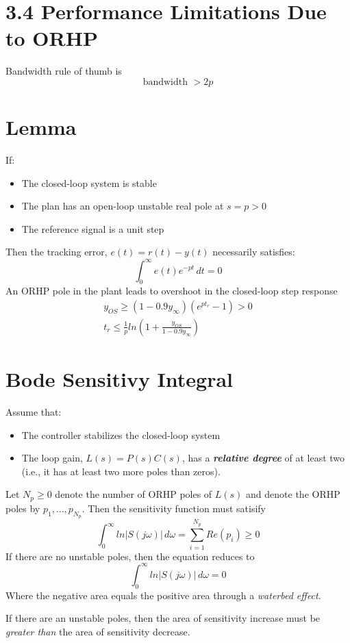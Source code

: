 \section*{3.4 Performance Limitations Due to ORHP}
Bandwidth rule of thumb is
\[ \text{bandwidth } > 2p \]

\section*{Lemma}
If:
\begin{itemize}
    \item The closed-loop system is stable
    \item The plan has an open-loop unstable real pole at \( s = p > 0 \)
    \item The reference signal is a unit step
\end{itemize}
Then the tracking error, \( e(t) = r(t) - y(t) \) necessarily satisfies:
\[
    \int_{0}^{\infty} e(t)e^{-pt} \,dt = 0
\]
An ORHP pole in the plant leads to overshoot in the closed-loop step response \\
\begin{gather*}
    y_{OS} \geq (1 - 0.9y_\infty)(e^{pt_r} - 1) > 0 \\
    t_r \leq \frac{1}{p} ln \left( 1 + \frac{y_{OS}}{1 - 0.9y_\infty} \right)
\end{gather*}

\section*{Bode Sensitivy Integral}
Assume that:
\begin{itemize}
    \item The controller stabilizes the closed-loop system
    \item The loop gain, \( L(s) = P(s) C(s) \), has a \textbf{\textit{relative degree}} of at least two (i.e., it has at least two more poles than zeros).
\end{itemize}
Let \( N_p \geq 0 \) denote the number of ORHP poles of \( L(s) \) and denote the ORHP poles by \( p_1, \ldots , p_{N_p} \). Then the sensitivity function must satisify
\[
    \int_{0}^{\infty} ln|S(j\omega)| \,d\omega = \sum_{i = 1}^{N_p} Re(p_i) \geq 0
\]
If there are no unstable poles, then the equation reduces to
\[
    \int_{0}^{\infty} ln|S(j\omega)| \,d\omega = 0
\]
Where the negative area equals the positive area through a \textit{waterbed effect}.

If there are an unstable poles, then the area of sensitivity increase must be \textit{greater than} the area of sensitivity decrease.

